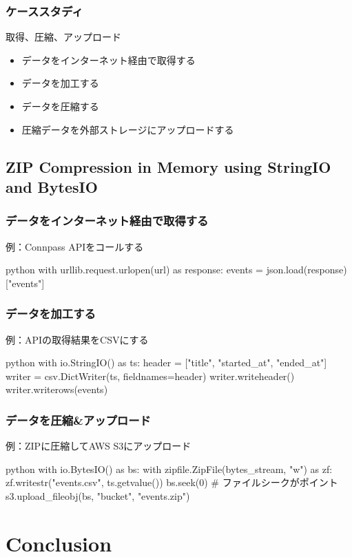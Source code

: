 \documentclass[aspectratio=169,dvipdfmx,14pt,notheorems]{beamer}
\theoremstyle{definition}
\begin{document}
\begin{frame}\frametitle{ケーススタディ}
\begin{block}{取得、圧縮、アップロード}
\begin{itemize}
\item データをインターネット経由で取得する
\item データを加工する
\item データを圧縮する
\item 圧縮データを外部ストレージにアップロードする

\end{itemize}
\end{block}
\end{frame}

\subsection{ZIP Compression in Memory using StringIO and BytesIO}

\begin{frame}[fragile]\frametitle{データをインターネット経由で取得する}

\begin{exampleblock}{例：Connpass APIをコールする}
\begin{pygments}{python}
with urllib.request.urlopen(url) as response:
    events = json.load(response)["events"]
\end{pygments}
\end{exampleblock}

\end{frame}

\begin{frame}[fragile]\frametitle{データを加工する}

\begin{exampleblock}{例：APIの取得結果をCSVにする}
\begin{pygments}{python}
with io.StringIO() as ts:
    header = ["title", "started_at", "ended_at"]
    writer = csv.DictWriter(ts, fieldnames=header)
    writer.writeheader()
    writer.writerows(events)
\end{pygments}
\end{exampleblock}

\end{frame}

\begin{frame}[fragile]\frametitle{データを圧縮\&アップロード}

\begin{exampleblock}{例：ZIPに圧縮してAWS S3にアップロード}
\begin{pygments}{python}
with io.BytesIO() as bs:
    with zipfile.ZipFile(bytes_stream, "w") as zf:
        zf.writestr("events.csv", ts.getvalue())
    bs.seek(0)  # ファイルシークがポイント
    s3.upload_fileobj(bs, "bucket", "events.zip")
\end{pygments}
\end{exampleblock}

\end{frame}



\section{Conclusion}
\end{document}

